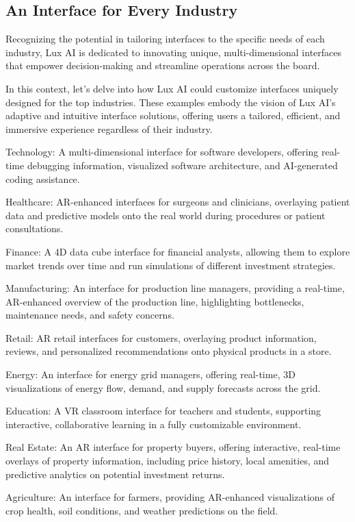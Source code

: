 \documentclass[11pt]{article}
\begin{document}
\subsection{An Interface for Every Industry}

Recognizing the potential in tailoring interfaces to the specific needs of each industry, Lux AI is dedicated to innovating unique, multi-dimensional interfaces that empower decision-making and streamline operations across the board.


In this context, let's delve into how Lux AI could customize interfaces uniquely designed for the top industries. These examples embody the vision of Lux AI's adaptive and intuitive interface solutions, offering users a tailored, efficient, and immersive experience regardless of their industry.


Technology: A multi-dimensional interface for software developers, offering real-time debugging information, visualized software architecture, and AI-generated coding assistance.


Healthcare: AR-enhanced interfaces for surgeons and clinicians, overlaying patient data and predictive models onto the real world during procedures or patient consultations.


Finance: A 4D data cube interface for financial analysts, allowing them to explore market trends over time and run simulations of different investment strategies.


Manufacturing: An interface for production line managers, providing a real-time, AR-enhanced overview of the production line, highlighting bottlenecks, maintenance needs, and safety concerns.


Retail: AR retail interfaces for customers, overlaying product information, reviews, and personalized recommendations onto physical products in a store.


Energy: An interface for energy grid managers, offering real-time, 3D visualizations of energy flow, demand, and supply forecasts across the grid.


Education: A VR classroom interface for teachers and students, supporting interactive, collaborative learning in a fully customizable environment.


Real Estate: An AR interface for property buyers, offering interactive, real-time overlays of property information, including price history, local amenities, and predictive analytics on potential investment returns.


Agriculture: An interface for farmers, providing AR-enhanced visualizations of crop health, soil conditions, and weather predictions on the field.
\end{document}

